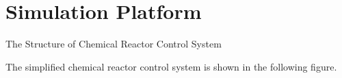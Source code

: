 
\section{Simulation Platform}

\begin{frame}{The Structure of Chemical Reactor Control System}
  \begin{overlayarea}{\textwidth}{7cm}
  The simplified chemical reactor control system is shown in the following figure.
  \begin{center}
    \resizebox{0.8\textwidth}{!}{
      \ifCompleteCompile
        
      \fi
    }
  \end{center}  
  \end{overlayarea} 
\end{frame}

